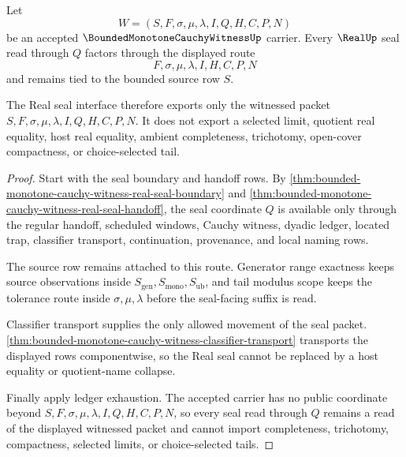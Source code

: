 \begin{theorem}
\label{thm:bounded-monotone-cauchy-witness-real-seal-row-scope}
Let
$$
W=(S,F,\sigma,\mu,\lambda,I,Q,H,C,P,N)
$$
be an accepted $\BoundedMonotoneCauchyWitnessUp$ carrier. Every $\RealUp$ seal read through $Q$ factors through the displayed route
$$
F,\sigma,\mu,\lambda,I,H,C,P,N
$$
and remains tied to the bounded source row $S$.

The Real seal interface therefore exports only the witnessed packet $S,F,\sigma,\mu,\lambda,I,Q,H,C,P,N$. It does not export a selected limit, quotient real equality, host real equality, ambient completeness, trichotomy, open-cover compactness, or choice-selected tail.
\end{theorem}
\begin{proof}
Start with the seal boundary and handoff rows. By \autoref{thm:bounded-monotone-cauchy-witness-real-seal-boundary} and \autoref{thm:bounded-monotone-cauchy-witness-real-seal-handoff}, the seal coordinate $Q$ is available only through the regular handoff, scheduled windows, Cauchy witness, dyadic ledger, located trap, classifier transport, continuation, provenance, and local naming rows.

The source row remains attached to this route. Generator range exactness keeps source observations inside $S_{\mathrm{gen}},S_{\mathrm{mono}},S_{\mathrm{ub}}$, and tail modulus scope keeps the tolerance route inside $\sigma,\mu,\lambda$ before the seal-facing suffix is read.

Classifier transport supplies the only allowed movement of the seal packet. \autoref{thm:bounded-monotone-cauchy-witness-classifier-transport} transports the displayed rows componentwise, so the Real seal cannot be replaced by a host equality or quotient-name collapse.

Finally apply ledger exhaustion. The accepted carrier has no public coordinate beyond $S,F,\sigma,\mu,\lambda,I,Q,H,C,P,N$, so every seal read through $Q$ remains a read of the displayed witnessed packet and cannot import completeness, trichotomy, compactness, selected limits, or choice-selected tails.
\end{proof}


